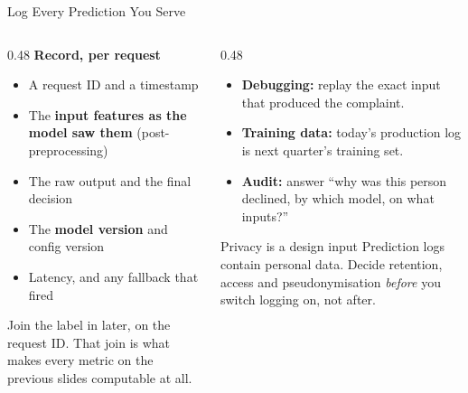 
\begin{frame}{Log Every Prediction You Serve}

    \begin{columns}[T]
        \begin{column}{0.48\textwidth}
            \small
            \textbf{Record, per request}
            \begin{itemize}
                \item A request ID and a timestamp
                \item The \textbf{input features as the model saw them} (post-preprocessing)
                \item The raw output and the final decision
                \item The \textbf{model version} and config version
                \item Latency, and any fallback that fired
            \end{itemize}
            \vspace{0.4em}
            Join the label in later, on the request ID. That join is what makes every metric on the previous
            slides computable at all.
        \end{column}
        \begin{column}{0.48\textwidth}
            \begin{tcolorbox}[colback=blue!5, colframe=blue!50, title=\small What this buys you]
                \small
                \begin{itemize}
                    \item \textbf{Debugging:} replay the exact input that produced the complaint.
                    \item \textbf{Training data:} today's production log is next quarter's training set.
                    \item \textbf{Audit:} answer ``why was this person declined, by which model, on what
                          inputs?''
                \end{itemize}
            \end{tcolorbox}
            \vspace{0.4em}
            \begin{alertblock}{\small Privacy is a design input}
                \small Prediction logs contain personal data. Decide retention, access and pseudonymisation
                \emph{before} you switch logging on, not after.
            \end{alertblock}
        \end{column}
    \end{columns}

\end{frame}
